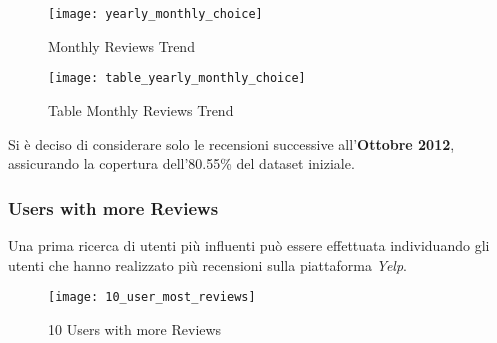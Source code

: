 \begin{figure}[!htbp]
	\texttt{[image: yearly\_monthly\_choice]}
	\caption{Monthly Reviews Trend}
	\label{yearly_monthly_choice}
\end{figure}

\begin{figure}[!htbp]
	\centering
	\texttt{[image: table\_yearly\_monthly\_choice]}
	\caption{Table Monthly Reviews Trend}
	\label{table_yearly_monthly_choice}
\end{figure}

Si è deciso di considerare solo le recensioni successive all'\textbf{Ottobre 2012},
assicurando la copertura dell'80.55\% del dataset iniziale.\\

\clearpage

\subsubsection{Users with more Reviews}
Una prima ricerca di utenti più influenti può essere effettuata individuando
gli utenti che hanno realizzato più recensioni sulla piattaforma \textit{Yelp}.

\begin{figure}[!htbp]
	\texttt{[image: 10\_user\_most\_reviews]}
	\caption{10 Users with more Reviews}
	\label{10_user_most_reviews}
\end{figure}
